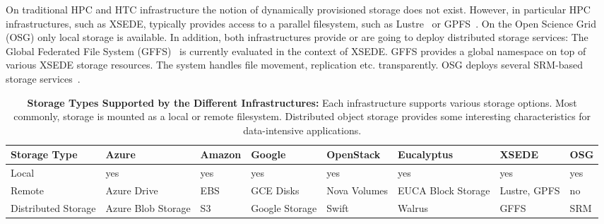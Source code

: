 \documentclass[times]{cpeauth}
\begin{document}
On traditional HPC and HTC infrastructure the notion of dynamically
provisioned storage does not exist. However, in particular HPC
infrastructures, such as XSEDE, typically provides access to a parallel
filesystem, such as Lustre~\cite{lustre} or
GPFS~\cite{Schmuck:2002:GSF:1083323.1083349}. On the Open Science Grid (OSG)
only local storage is available. In addition, both infrastructures provide or
are going to deploy distributed storage services: The Global Federated File
System (GFFS)~\cite{gffs} is currently evaluated in the context of XSEDE. GFFS
provides a global namespace on top of various XSEDE storage resources. The
system handles file movement, replication etc. transparently. OSG deploys 
several SRM-based storage services~\cite{srm-ogf}.



\begin{table}[t]
\centering
\begin{tabular}{|p{1.7cm}|p{1.3cm}|p{1.3cm}|p{1.3cm}|p{1.4cm}|p{1.4cm}|p{1.3cm}|p{1.2cm}|}
	\hline
	\textbf{Storage Type} &\textbf{Azure} &\textbf{Amazon} &\textbf{Google} &\textbf{Open\-Stack} &\textbf{Euca\-lyptus} &\textbf{XSEDE}  &\textbf{OSG} \\
	\hline
	Local	&yes &yes &yes &yes &yes &yes &yes\\
	\hline
	Remote &Azure Drive &EBS &GCE Disks &Nova Volumes &EUCA Block Storage &Lustre, GPFS 
	&no\\
	\hline
	Distributed Storage &Azure Blob Storage &S3 &Google Storage &Swift & Walrus &GFFS
	 &SRM\\
	\hline	
\end{tabular}
\caption{\textbf{Storage Types Supported by the Different Infrastructures:} 
Each infrastructure supports various storage options. Most commonly, storage 
is mounted as a local or remote filesystem. Distributed object storage 
provides some interesting characteristics for data-intensive applications. 
\label{tab:storage-systems}}
\end{table}

\end{document}
